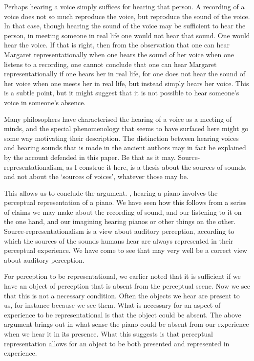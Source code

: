 \documentclass[sloppy, journal, git, bytitle, dodraft]{humapap}
\begin{document}
Perhaps hearing a voice simply suffices for hearing that person. A recording of a voice does not so much reproduce the voice, but reproduce the sound of the voice. In that case, though hearing the sound of the voice may be sufficient to hear the person, in meeting someone in real life one would not hear that sound. One would hear the voice. If that is right, then from the observation that one can hear Margaret representationally when one hears the sound of her voice when one listens to a recording, one cannot conclude that one can hear Margaret representationally if one hears her in real life, for one does not hear the sound of her voice when one meets her in real life, but instead simply hears her voice. This is a subtle point, but it might suggest that it is not possible to hear someone's voice in someone's absence. 

Many philosophers have characterised the hearing of a voice as a meeting of minds, and the special phenomenology that seems to have surfaced here might go some way motivating their description. The distinction between hearing voices and hearing sounds that is made in the ancient authors may in fact be explained by the account defended in this paper. Be that as it may. Source-representationalism, as I construe it here, is a thesis about the sources of sounds, and not about the `sources of voices', whatever those may be.


\sect This allows us to conclude the argument. %
, hearing a piano involves the perceptual representation of a piano. We have seen how this follows from a series of claims we may make about the recording of sound, and our listening to it on the one hand, and our imagining hearing pianos or other things on the other. Source-representationalism is a view about auditory perception, according to which the sources of the sounds humans hear are always represented in their perceptual experience. We have come to see that may very well be a correct view about auditory perception.

For perception to be representational, we earlier noted that it is sufficient if we have an object of perception that is absent from the perceptual scene. Now we see that this is not a necessary condition. Often the objects we hear are present to us, for instance because we see them. What is necessary for an aspect of experience to be representational is that the object could be absent. The above argument brings out in what sense the piano could be absent from our experience when we hear it in its presence. What this suggests is that perceptual representation allows for an object to be both presented and represented in experience. 
\end{document}
